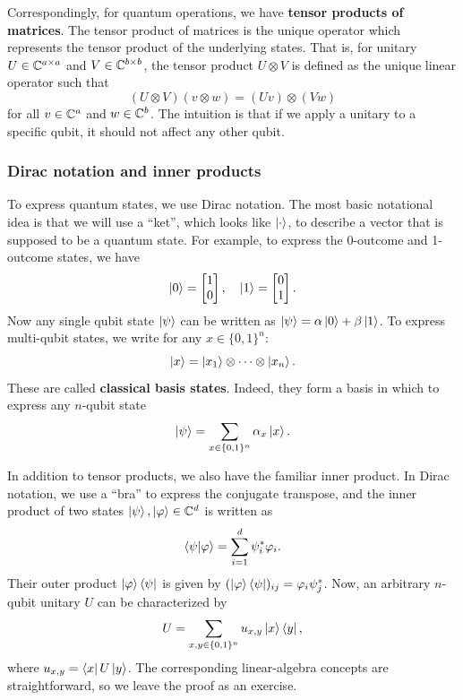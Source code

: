 \documentclass[a4paper,draft]{article}
\begin{document}
Correspondingly, for quantum operations, we have \textbf{tensor products
of matrices}. The tensor product of matrices is the unique operator which
represents the tensor product of the underlying states. That is, for
unitary $U \in \mathbb{C}^{a \times a}$ and $V \in \mathbb{C}^{b \times b}$, the tensor
product $U \otimes V$ is defined as the unique linear operator such that
\[
  (U \otimes V) (v \otimes w) = (U v) \otimes (V w)
\]
for all $v \in \mathbb{C}^a$ and $w \in \mathbb{C}^b$. The intuition is that if we apply
  a unitary to a specific qubit, it should not affect any other qubit.

\subsubsection*{Dirac notation and inner products}

To express quantum states, we use Dirac notation. The most basic
notational idea is that we will use a ``ket'', which looks like
$\left\lvert \cdot\right\rangle$, to describe a vector that is supposed to be a quantum
state. For example, to express the 0-outcome and 1-outcome states, we have
\[
  \left\lvert 0\right\rangle = \begin{bmatrix}
    1 \\ 0
  \end{bmatrix}, \quad
  \left\lvert 1\right\rangle = \begin{bmatrix}
    0 \\ 1
  \end{bmatrix}.
\]
Now any single qubit state $\left\lvert \psi\right\rangle$ can be written as $\left\lvert \psi\right\rangle
  = \alpha \left\lvert 0\right\rangle + \beta \left\lvert 1\right\rangle$. To express multi-qubit states, we
  write for any $x \in \{ 0, 1 \}^n$:
\[
  \left\lvert x\right\rangle = \left\lvert x_1\right\rangle \otimes \dots \otimes \left\lvert x_n\right\rangle.
\]
These are called \textbf{classical basis states}. Indeed, they form a
  basis in which to express any $n$-qubit state
\[
  \left\lvert \psi\right\rangle = \sum_{x \in \{0, 1\}^n} \alpha_x \left\lvert x\right\rangle.
\]

In addition to tensor products, we also have the familiar inner product.
In Dirac notation, we use a ``bra'' to express the conjugate transpose,
and the inner product of two states $\left\lvert \psi\right\rangle, \left\lvert \varphi\right\rangle \in \mathbb{C}^d$ is
written as
\[
  \left\langle \psi | \varphi \right\rangle = \sum_{i=1}^d \psi_i^* \varphi_i.
\]
Their outer product $\left\lvert \varphi\right\rangle \left\langle \psi \right\rvert$ is given by $(\left\lvert \varphi\right\rangle
  \left\langle \psi \right\rvert)_{ij} = \varphi_i \psi_j^*$. Now, an arbitrary $n$-qubit
  unitary $U$ can be characterized by
\[
  U  = \sum_{x, y \in \{0, 1\}^n} u_{x, y} \left\lvert x\right\rangle \left\langle y \right\rvert,
\]
where $u_{x, y} = \left\langle x \right\rvert U \left\lvert y\right\rangle$. The corresponding linear-algebra
  concepts are straightforward, so we leave the proof as an exercise.
\end{document}
